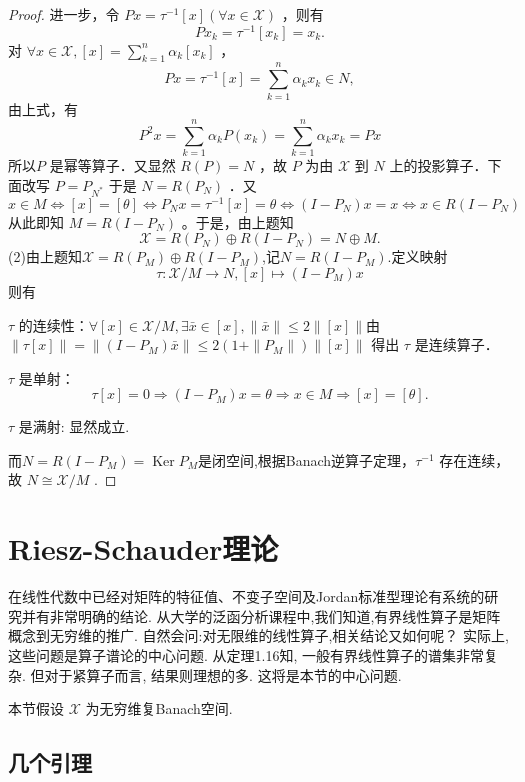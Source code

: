 \documentclass[lang=cn,newtx,10pt,scheme=chinese,thmcnt=chapter]{elegantbook}
\newcommand{\Ker}{\operatorname{Ker}}
\begin{document}
\begin{problemset}
\begin{proof}
进一步，令 $P x=\tau^{-1}[x](\forall x \in \mathcal{X})$ ，则有
$$
P x_k=\tau^{-1}\left[x_k\right]=x_k .
$$
对 $\forall x \in \mathcal{X},[x]=\sum_{k=1}^n \alpha_k\left[x_k\right]$ ，
$$
P x=\tau^{-1}[x]=\sum_{k=1}^n \alpha_k x_k \in N,
$$
由上式，有
\[
P^2x = \sum_{k=1}^n \alpha_kP( x_k)= \sum_{k=1}^n \alpha_k x_k=Px  
\]
所以$P$ 是幂等算子．又显然 $R(P)=N$ ，故 $P$ 
为由 $\mathcal{X}$ 到 $N$ 上的投影算子．下面改写 $P=P_{N^*}$ 于是 $N=R\left(P_N\right)$ ．又
$$x \in M\Leftrightarrow 
[x]=[\theta] \Longleftrightarrow P_N x=\tau^{-1}[x]=\theta \Longleftrightarrow\left(I-P_N\right) x=x\Leftrightarrow
x \in R\left(I-P_N\right)$$
从此即知 $M=R\left(I-P_N\right)$ 。于是，由上题知
$$
\mathcal{X}=R\left(P_N\right) \oplus R\left(I-P_N\right)=N \oplus M .
$$
(2)由上题知$\mathcal{X}=R(P_M)\oplus R(I-P_M)$,记$N=R(I-P_M)$.定义映射\[
\tau: \mathcal{X}/M\to N,[x]\mapsto (I-P_M)x
\]
则有

$\tau$ 的连续性：$\forall [x]\in \mathcal{X}/M,\exists \bar{x}\in [x],\|\bar{x}\|\leqslant 2\|[x]\|$由 $\|\tau[ x]\|=\|(I-P_M)\bar{x}\| \leqslant2(1+\|P_M\|)\|[x]\|$ 得出 $\tau$ 是连续算子．

$\tau$ 是单射：
$$
\tau[x]=0 \Longrightarrow(I-P_M)x=\theta \Longrightarrow x \in  M \Longrightarrow [x]=[\theta] .
$$

$\tau$ 是满射: 显然成立.

而$N=R(I-P_M)=\Ker P_M$是闭空间,根据Banach逆算子定理，$\tau^{-1}$ 存在连续，故 $N \cong \mathcal{X} / M$ .

\end{proof}

\end{problemset}

\section{Riesz-Schauder理论}

在线性代数中已经对矩阵的特征值、不变子空间及Jordan标准型理论有系统的研究并有非常明确的结论. 从大学的泛函分析课程中,我们知道,有界线性算子是矩阵概念到无穷维的推广. 自然会问:对无限维的线性算子,相关结论又如何呢？ 实际上, 这些问题是算子谱论的中心问题. 从定理1.16知, 一般有界线性算子的谱集非常复杂. 但对于紧算子而言, 结果则理想的多. 这将是本节的中心问题.

本节假设 \(\mathcal{X}\) 为无穷维复Banach空间.

\subsection{几个引理}
\end{document}
